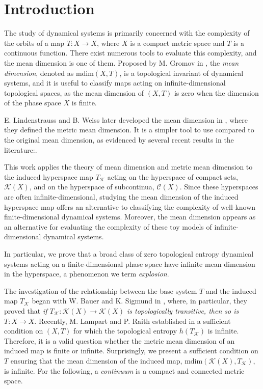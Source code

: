 \documentclass[sn-mathphys-num]{sn-jnl}%
\theoremstyle{thmstyleone}%
\theoremstyle{thmstyletwo}%
\theoremstyle{thmstylethree}%
\newcommand*\induce[1]{#1_\mathcal{K}}
\newcommand*\hyp[1]{\mathcal{#1}}
\begin{document}
\section{Introduction}

The study of dynamical systems is primarily concerned with the complexity of the orbits of a map $T: X \to X$, where $X$ is a compact metric space and $T$ is a continuous function. There exist numerous tools to evaluate this complexity, and the mean dimension is one of them. Proposed by M. Gromov in \cite{gromov_1999}, the \emph{mean dimension}, denoted as $\text{mdim}(X, T)$, is a topological invariant of dynamical systems, and it is useful to classify maps acting on infinite-dimensional topological spaces, as the mean dimension of $(X, T)$ is zero when the dimension of the phase space $X$ is finite.

E. Lindenstrauss and B. Weiss later developed the mean dimension in \cite{lindenstrauss_weiss_2000}, where they defined the metric mean dimension. It is a simpler tool to use compared to the original mean dimension, as evidenced by several recent results in the literature:\cite{hayes_2017, lindenstrauss_tsukamoto_2018, carvalho_rodrigues_varandas_2020, acevedo_romana_arias_2024}.


This work applies the theory of mean dimension and metric mean dimension to the induced hyperspace map $\induce{T}$ acting on the hyperspace of compact sets, $\hyp{K}(X)$, and on the hyperspace of subcontinua, $\hyp{C}(X)$. Since these hyperspaces are often infinite-dimensional, studying the mean dimension of the induced hyperspace map offers an alternative to classifying the complexity of well-known finite-dimensional dynamical systems. Moreover, the mean dimension appears as an alternative for evaluating the complexity of these toy models of infinite-dimensional dynamical systems.

In particular, we prove that a broad class of zero topological entropy dynamical systems acting on a finite-dimensional phase space have infinite mean dimension in the hyperspace, a phenomenon we term \textit{explosion}.

The investigation of the relationship between the base system $T$ and the induced map $\induce{T}$ began with W. Bauer and K. Sigmund in \cite{bauer_sigmund_1975}, where, in particular, they proved that \textit{if $\induce{T}: \hyp{K}(X) \to \hyp{K}(X)$ is topologically transitive, then so is $T: X \to X$}. Recently, M. Lampart and P. Raith established in \cite{lampart_raith_2010} a sufficient condition on $(X, T)$ for which the topological entropy $h(\induce{T})$ is infinite. Therefore, it is a valid question whether the metric mean dimension of an induced map is finite or infinite. Surprisingly, we present a sufficient condition on $T$ ensuring that the mean dimension of the induced map, $\text{mdim}(\hyp{K}(X), \induce{T})$, is infinite. For the following, a \emph{continuum} is a compact and connected metric space.\\
\end{document}
